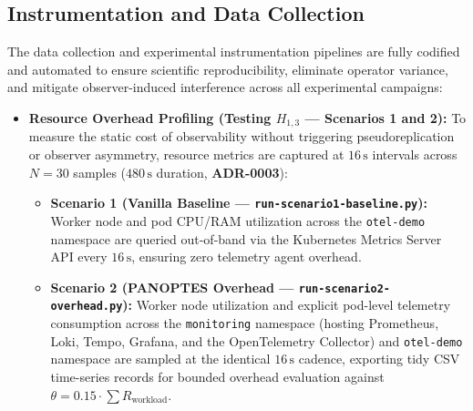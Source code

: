 \subsection{Instrumentation and Data Collection}
\label{sec:data-collection}

The data collection and experimental instrumentation pipelines are fully codified and automated to ensure scientific reproducibility, eliminate operator variance, and mitigate observer-induced interference across all experimental campaigns:

\begin{itemize}
    \item \textbf{Resource Overhead Profiling (Testing $H_{1,3}$ --- Scenarios 1 and 2):} To measure the static cost of observability without triggering pseudoreplication or observer asymmetry, resource metrics are captured at $16\,\text{s}$ intervals across $N=30$ samples ($480\,\text{s}$ duration, \textbf{ADR-0003}):
    \begin{itemize}
        \item \textbf{Scenario 1 (Vanilla Baseline --- \texttt{run-scenario1-baseline.py}):} Worker node and pod CPU/RAM utilization across the \texttt{otel-demo} namespace are queried out-of-band via the Kubernetes Metrics Server API every $16\,\text{s}$, ensuring zero telemetry agent overhead.
        \item \textbf{Scenario 2 (PANOPTES Overhead --- \texttt{run-scenario2-overhead.py}):} Worker node utilization and explicit pod-level telemetry consumption across the \texttt{monitoring} namespace (hosting Prometheus, Loki, Tempo, Grafana, and the OpenTelemetry Collector) and \texttt{otel-demo} namespace are sampled at the identical $16\,\text{s}$ cadence, exporting tidy CSV time-series records for bounded overhead evaluation against $\theta = 0.15 \cdot \sum R_{\text{workload}}$.
    \end{itemize}


\end{itemize}
